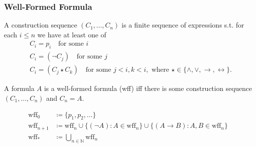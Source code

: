 \documentclass[UTF8,aspectratio=43,11pt,colorlinks,compress,openany]{beamer}%
\begin{document}
\begin{frame}\frametitle{Well-Formed Formula}
\setlength\abovedisplayskip{0pt}
\setlength\belowdisplayskip{0pt}
	\begin{definition}
		A construction sequence $(C_1,\dots, C_n)$ is a finite sequence of expressions s.t. for each $i\leq n$ we have at least one of 
		\begin{align*}
		&C_i=p_i\quad\text{for some $i$}\\
		&C_i=(\neg C_j)\quad\text{for some $j$}\\
		&C_i=(C_j\star C_k)\quad\text{for some $j<i, k<i$}, \mbox{ where }\star\in\{\wedge,\vee,\to,\leftrightarrow\}.
		\end{align*}
	\end{definition}
	\begin{definition}
	A formula $A$ is a well-formed formula (wff) iff there is some construction sequence $(C_1,\dots, C_n)$ and $C_n=A$.
	\end{definition}\vspace*{-3ex}
\begin{align*}
\mathrm{wff}_0&\coloneqq \{p_1,p_2,\dots\}\\
\mathrm{wff}_{n+1}&\coloneqq \mathrm{wff}_n\cup\big\{(\neg A): A\in\mathrm{wff}_n\big\}\cup\big\{(A\to B): A, B\in\mathrm{wff}_n\big\}\\
\mathrm{wff}_*&\coloneqq \bigcup\limits_{n\in\mathbb{N}}\mathrm{wff}_n
\end{align*}
\end{frame}
\end{document}
